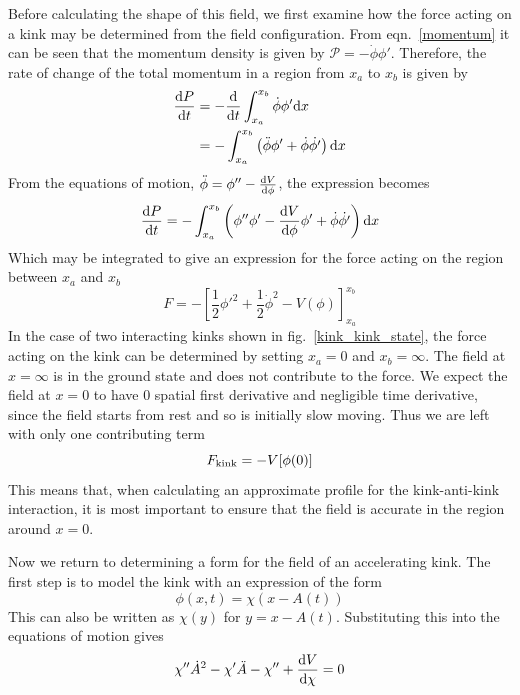 \documentclass[11pt, oneside]{article}  	%
\numberwithin{equation}{section}
\newcommand{\drv}{\ensuremath{\textup{d}}}
\begin{document}
Before calculating the shape of this field, we first examine how the force acting on a kink may be determined from the field configuration. From eqn.~\ref{momentum} it can be seen that the momentum density is given by $\mathcal{P} = -\dot{\phi}\phi'$. Therefore, the rate of change of the total momentum in a region from $x_a$ to $x_b$ is given by
\begin{align}
\frac{\drv P}{\drv t} &= -\frac{\drv}{\drv t} \int_{x_a}^{x_b} \dot{\phi}\phi' \drv x \\
 &= - \int_{x_a}^{x_b} \left ( \ddot{\phi}\phi' + \dot{\phi}\dot{\phi'} \right )\drv x
\end{align}
From the equations of motion, $\ddot{\phi} = \phi'' - \frac{\drv V}{\drv\phi}$, the expression becomes
 \begin{equation}
\frac{\drv P}{\drv t} = - \int_{x_a}^{x_b} \left ( \phi'' \phi' - \frac{\drv V}{\drv\phi} \phi' + \dot{\phi}\dot{\phi'} \right )\drv x
\end{equation}
Which may be integrated to give an expression for the force acting on the region between $x_a$ and $x_b$
\begin{equation}
F = -\left [ \frac{1}{2} \phi'^2 + \frac{1}{2} \dot{\phi}^2 - V(\phi) \right ]_{x_a}^{x_b}
 \end{equation}
 In the case of two interacting kinks shown in fig.~\ref{kink_kink_state}, the force acting on the kink can be determined by setting $x_a = 0$ and $x_b = \infty$. The field at $ x =\infty$ is in the ground state and does not contribute to the force. We expect the field at $x=0$ to have 0 spatial first derivative and negligible time derivative, since the field starts from rest and so is initially slow moving. Thus we are left with only one contributing term
 \begin{equation} \label{force}
F_\textup{kink} = - V[\phi(0)] 
 \end{equation}
 This means that, when calculating an approximate profile for the kink-anti-kink interaction, it is most important to ensure that the field is accurate in the region around $x=0$.\par
 Now we return to determining a form for the field of an accelerating kink. The first step is to model the kink with an expression of the form
 \begin{equation}
 \phi(x,t) = \chi\left( x - A(t)\right)
 \end{equation}
 This can also be written as $\chi\left( y\right)$ for $y = x-A(t)$. Substituting this into the equations of motion gives
 \begin{equation}
 \chi '' \dot{A}^2 - \chi'\ddot{A} - \chi '' + \frac{\drv V }{\drv \chi}=0
 \end{equation}
\end{document}
